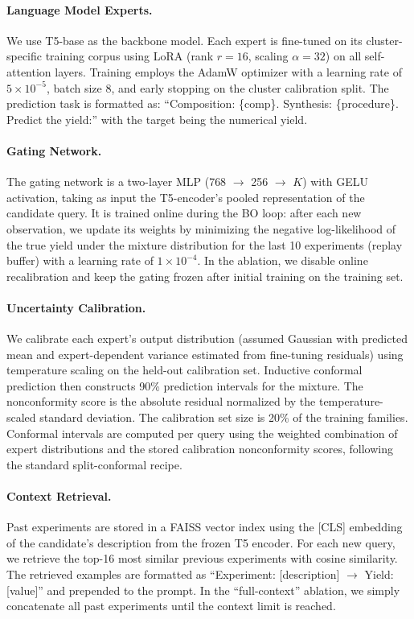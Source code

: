 \documentclass{article}
\begin{document}
\paragraph{Language Model Experts.} We use T5-base as the backbone model. Each expert is fine-tuned on its cluster-specific training corpus using LoRA (rank $r=16$, scaling $\alpha=32$) on all self-attention layers. Training employs the AdamW optimizer with a learning rate of $5 \times 10^{-5}$, batch size 8, and early stopping on the cluster calibration split. The prediction task is formatted as: ``Composition: \{comp\}. Synthesis: \{procedure\}. Predict the yield:'' with the target being the numerical yield.

\paragraph{Gating Network.} The gating network is a two-layer MLP (768 $\to$ 256 $\to$ $K$) with GELU activation, taking as input the T5-encoder's pooled representation of the candidate query. It is trained online during the BO loop: after each new observation, we update its weights by minimizing the negative log-likelihood of the true yield under the mixture distribution for the last 10 experiments (replay buffer) with a learning rate of $1 \times 10^{-4}$. In the ablation, we disable online recalibration and keep the gating frozen after initial training on the training set.

\paragraph{Uncertainty Calibration.} We calibrate each expert's output distribution (assumed Gaussian with predicted mean and expert-dependent variance estimated from fine-tuning residuals) using temperature scaling on the held-out calibration set. Inductive conformal prediction then constructs 90\% prediction intervals for the mixture. The nonconformity score is the absolute residual normalized by the temperature-scaled standard deviation. The calibration set size is 20\% of the training families. Conformal intervals are computed per query using the weighted combination of expert distributions and the stored calibration nonconformity scores, following the standard split-conformal recipe.

\paragraph{Context Retrieval.} Past experiments are stored in a FAISS vector index using the [CLS] embedding of the candidate's description from the frozen T5 encoder. For each new query, we retrieve the top-16 most similar previous experiments with cosine similarity. The retrieved examples are formatted as ``Experiment: [description] $\to$ Yield: [value]'' and prepended to the prompt. In the ``full-context'' ablation, we simply concatenate all past experiments until the context limit is reached.
\end{document}
